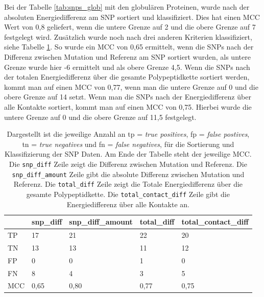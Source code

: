 Bei der Tabelle \ref{tab:snps_glob} mit den globulären Proteinen, wurde nach der absoluten Energiedifferenz am \ac{SNP} sortiert und klassifiziert. Dies hat einen MCC Wert von 0,8 geliefert, wenn die untere Grenze auf 2 und die obere Grenze auf 7 festgelegt wird. Zusätzlich wurde noch nach drei anderen Kriterien klassifiziert, siehe Tabelle \ref{tab:mcc_table}. So wurde ein MCC von 0,65 ermittelt, wenn die \ac{SNP}s nach der Differenz zwischen Mutation und Referenz am \ac{SNP} sortiert wurden, als untere Grenze wurde hier -6 ermittelt und als obere Grenze 4,5. Wenn die \ac{SNP}s nach der totalen Energiedifferenz über die gesamte Polypeptidkette sortiert werden, kommt man auf einen MCC von 0,77, wenn man die untere Grenze auf 0 und die obere Grenze auf 14 setzt. Wenn man die \ac{SNP}s nach der Energiedifferenz über alle Kontakte sortiert, kommt man auf einen MCC von 0,75. Hierbei wurde die untere Grenze auf 0 und die obere Grenze auf 11,5 festgelegt.

\begin{table}[]
    \centering
    \caption{Dargestellt ist die jeweilige Anzahl an tp = \emph{true positives}, fp = \emph{false postives}, tn = \emph{true negatives} und fn = \emph{false negatives}, für die Sortierung und Klassifizierung der \ac{SNP} Daten. Am Ende der Tabelle steht der jeweilige \acf{MCC}. Die \texttt{snp\_diff} Zeile zeigt die Differenz zwischen Mutation und Referenz. Die \texttt{snp\_diff\_amount} Zeile gibt die absolute Differenz zwischen Mutation und Referenz. Die \texttt{total\_diff} Zeile zeigt die Totale Energiedifferenz über die gesamte Polypeptidkette. Die \texttt{total\_contact\_diff} Zeile gibt die Energiedifferenz über alle Kontakte an.}
    \label{tab:mcc_table}
    \begin{tabular}{l|l|l|l|l|}
        \cline{2-5}
         & snp\_diff & snp\_diff\_amount & total\_diff & total\_contact\_diff \\ \hline
        \multicolumn{1}{|l|}{TP} & 17 & 21 & 22 & 20 \\ \hline
        \multicolumn{1}{|l|}{TN} & 13 & 13 & 11 & 12 \\ \hline
        \multicolumn{1}{|l|}{FP} & 0 & 0 & 1 & 0 \\ \hline
        \multicolumn{1}{|l|}{FN} & 8 & 4 & 3 & 5 \\ \hline
        \multicolumn{1}{|l|}{MCC} & \cellcolor[HTML]{FFFFC7}0,65 & \cellcolor[HTML]{9AFF99}0,80 & \cellcolor[HTML]{CBFFCB}0,77 & \cellcolor[HTML]{E2FFE2}0,75 \\ \hline
    \end{tabular}
\end{table}



